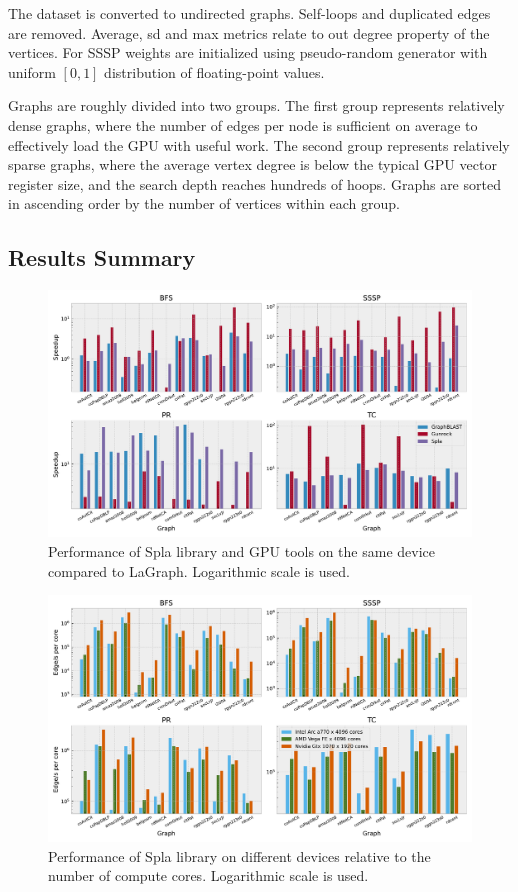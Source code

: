 The dataset is converted to undirected graphs. Self-loops and duplicated edges are removed. Average, sd and max metrics relate to out degree property of the vertices. For SSSP weights are initialized using pseudo-random generator with uniform $[0, 1]$ distribution of floating-point values.

Graphs are roughly divided into two groups. The first group represents relatively dense graphs, where the number of edges per node is sufficient on average to effectively load the GPU with useful work. The second group represents relatively sparse graphs, where the average vertex degree is below the typical GPU vector register size, and the search depth reaches hundreds of hoops. Graphs are sorted in ascending order by the number of vertices within each group.

\subsection{Results Summary}

\begin{figure}[tbp]
\centering
\includegraphics[width=1.0\linewidth]{plots/rq1_rel.pdf}
\caption{Performance of Spla library and GPU tools on the same device compared to LaGraph. Logarithmic scale is used.}
\label{fig:rq1_chart}
\end{figure}

\begin{figure}[tbp]
\centering
\includegraphics[width=1.0\linewidth]{plots/rq2_cores.pdf}
\caption{Performance of Spla library on different devices relative to the number of compute cores. Logarithmic scale is used.}
\label{fig:rq2_chart}
\end{figure}


